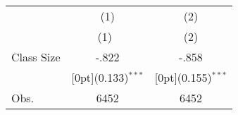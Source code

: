\begin{tabular*}{\textwidth}{@{\extracolsep{\fill}}lcc}		
	& \multicolumn{1}{c}{(1)} &	\multicolumn{1}{c}{(2)} \\
\cline{2-3}		
	& \multicolumn{1}{c}{(1)\mbox{\ }} &	\multicolumn{1}{c}{(2)} \\
\hline		
Class Size &	-.822 &	-.858 \\
&	\raisebox{.7ex}[0pt]{\scriptsize (0.133)$^{***}$} &	\raisebox{.7ex}[0pt]{\scriptsize (0.155)$^{***}$} \\
Obs. &	6452 &	6452 \\
\hline\hline		
\end{tabular*}%

